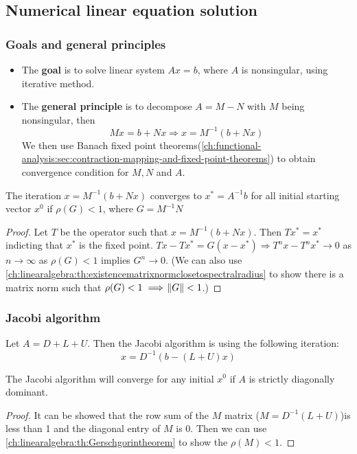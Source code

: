 \begin{refsection}
\subsection{Numerical linear equation solution}
\subsubsection{Goals and general principles}
\begin{mdframed}
\begin{itemize}
	\item The \textbf{goal} is to solve linear system $Ax=b$, where $A$ is nonsingular,  using iterative method.
	\item The \textbf{general principle} is to decompose $A=M-N$ with $M$ being nonsingular, then 
	$$Mx = b + Nx \Rightarrow x = M^{-1}(b+Nx)$$
	We then use Banach fixed point theorems(\autoref{ch:functional-analysis:sec:contraction-mapping-and-fixed-point-theorems}) to obtain convergence condition for $M, N$ and $A$. 
\end{itemize}
\end{mdframed}


\begin{theorem}\cite[614]{golub2013matrix}
The iteration $x = M^{-1}(b+Nx)$ converges to $x^* = A^{-1}b$ for all initial starting vector $x^0$ if $\rho(G) < 1$, where $G=M^{-1}N$
\end{theorem}
\begin{proof}
	Let $T$ be the operator such that $x = M^{-1}(b+Nx)$. Then $Tx^* = x^*$ indicting that $x^*$ is the fixed point. 
	$Tx-Tx^* = G(x-x^*) \Rightarrow T^nx - T^n x^* \to 0$ as $n\to \infty$ as $\rho(G) < 1$ implies $G^n\to 0$.
	(We can also use \autoref{ch:linearalgebra:th:existencematrixnormclosetospectralradius} to show there is a matrix norm such that $\rho(G) < 1 \implies \norm{G} < 1$.)
\end{proof}




\subsubsection{Jacobi algorithm}
\begin{definition}
Let $A = D + L + U$. Then the Jacobi algorithm is using the following iteration:
$$x = D^{-1}(b - (L+U)x)$$
\end{definition}

\begin{lemma}\cite[615]{golub2013matrix}
	The Jacobi algorithm will converge for any initial $x^0$ if $A$ is strictly diagonally dominant.
\end{lemma}
\begin{proof}
	It can be showed that the row sum of the $M$ matrix ($M = D^{-1}(L + U)$)is less than 1 and the diagonal entry of $M$ is 0. Then we can use \autoref{ch:linearalgebra:th:Gerschgorintheorem} to show the $\rho(M)<1$.
\end{proof}


\end{refsection}
